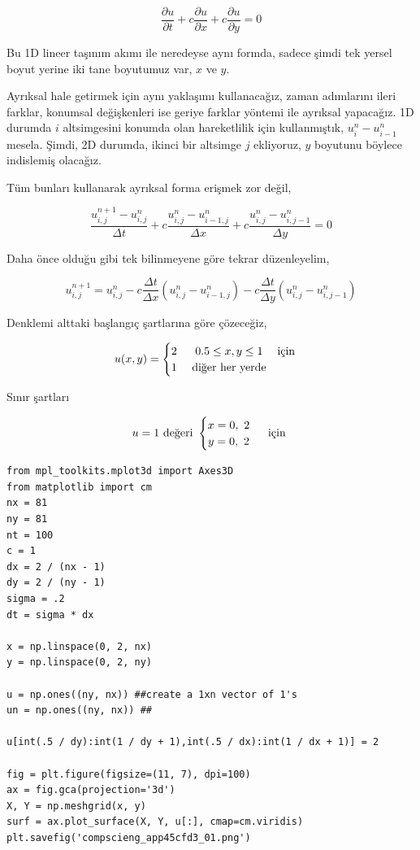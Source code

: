 \documentclass[12pt,fleqn]{article}\usepackage{../../common}
\begin{document}
$$
\frac{\partial u}{\partial t} +
c\frac{\partial u}{\partial x} +
c\frac{\partial  u}{\partial y} = 0
$$

Bu 1D lineer taşınım akımı ile neredeyse aynı formda, sadece şimdi tek yersel
boyut yerine iki tane boyutumuz var, $x$ ve $y$.

Ayrıksal hale getirmek için aynı yaklaşımı kullanacağız, zaman adımlarını ileri
farklar, konumsal değişkenleri ise geriye farklar yöntemi ile ayrıksal
yapacağız. 1D durumda $i$ altsimgesini konumda olan hareketlilik için
kullanmıştık,  $u_{i}^n-u_{i-1}^n$ mesela. Şimdi, 2D durumda, ikinci bir
altsimge $j$ ekliyoruz, $y$ boyutunu böylece indislemiş olacağız.

Tüm bunları kullanarak ayrıksal forma erişmek zor değil,

$$
\frac{u_{i,j}^{n+1}-u_{i,j}^n}{\Delta t} +
c\frac{u_{i, j}^n-u_{i-1,j}^n}{\Delta x} +
c\frac{u_{i,j}^n-u_{i,j-1}^n}{\Delta y}=0
$$

Daha önce olduğu gibi tek bilinmeyene göre tekrar düzenleyelim,

$$
u_{i,j}^{n+1} =
u_{i,j}^n-c \frac{\Delta t}{\Delta x}(u_{i,j}^n-u_{i-1,j}^n) -
c \frac{\Delta t}{\Delta y}(u_{i,j}^n-u_{i,j-1}^n)
$$

Denklemi alttaki başlangıç şartlarına göre çözeceğiz,

$$
u(x,y) = \begin{cases}
\begin{matrix}
2\ & 0.5 \leq x, y \leq 1   & \text{için}  \cr
1\ & \text{diğer her yerde}
\end{matrix}\end{cases}
$$

Sınır şartları

$$
u = 1\ \text{değeri } \begin{cases}
\begin{matrix}
x =  0,\ 2 \cr
y =  0,\ 2 \end{matrix}\end{cases}
\text{ için }
$$

\begin{verbatim}
from mpl_toolkits.mplot3d import Axes3D    
from matplotlib import cm
nx = 81
ny = 81
nt = 100
c = 1
dx = 2 / (nx - 1)
dy = 2 / (ny - 1)
sigma = .2
dt = sigma * dx

x = np.linspace(0, 2, nx)
y = np.linspace(0, 2, ny)

u = np.ones((ny, nx)) ##create a 1xn vector of 1's
un = np.ones((ny, nx)) ##

u[int(.5 / dy):int(1 / dy + 1),int(.5 / dx):int(1 / dx + 1)] = 2 

fig = plt.figure(figsize=(11, 7), dpi=100)
ax = fig.gca(projection='3d')                      
X, Y = np.meshgrid(x, y)                            
surf = ax.plot_surface(X, Y, u[:], cmap=cm.viridis)
plt.savefig('compscieng_app45cfd3_01.png')
\end{verbatim}
\end{document}
